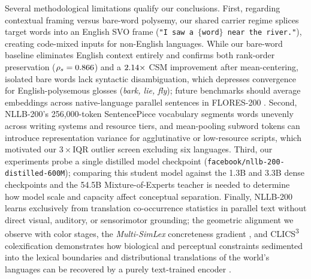 Several methodological limitations qualify our conclusions.
First, regarding contextual framing versus bare-word polysemy, our shared carrier regime splices target words into an English SVO frame (\texttt{"I saw a }$\{$\texttt{word}$\}$\texttt{ near the river."}), creating code-mixed inputs for non-English languages.
While our bare-word baseline eliminates English context entirely and confirms both rank-order preservation ($\rho_s = 0.866{}$) and a $2.14{}\times$ CSM improvement after mean-centering, isolated bare words lack syntactic disambiguation, which depresses convergence for English-polysemous glosses (\emph{bark, lie, fly}); future benchmarks should average embeddings across native-language parallel sentences in FLORES-200 \citep{nllbteam2022}.
Second, NLLB-200's 256,000-token SentencePiece vocabulary segments words unevenly across writing systems and resource tiers, and mean-pooling subword tokens can introduce representation variance for agglutinative or low-resource scripts, which motivated our $3\times\text{IQR}$ outlier screen excluding six languages.
Third, our experiments probe a single distilled model checkpoint (\texttt{facebook/nllb-200-distilled-600M}); comparing this student model against the 1.3B and 3.3B dense checkpoints and the 54.5B Mixture-of-Experts teacher \citep{nllbteam2022} is needed to determine how model scale and capacity affect conceptual separation.
Finally, NLLB-200 learns exclusively from translation co-occurrence statistics in parallel text without direct visual, auditory, or sensorimotor grounding; the geometric alignment we observe with \citet{berlin1969} color stages, the \emph{Multi-SimLex} concreteness gradient \citep{vulic2020}, and CLICS\textsuperscript{3} colexification demonstrates how biological and perceptual constraints sedimented into the lexical boundaries and distributional translations of the world's languages can be recovered by a purely text-trained encoder \citep{thierry2007,berlin1969,list2018}.
